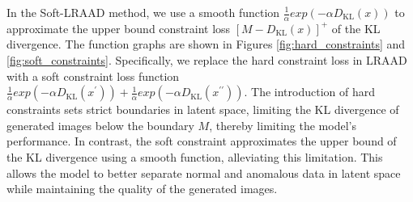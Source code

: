 \documentclass{article}
\begin{document}
In the Soft-LRAAD method, we use a smooth function $\frac{1}{\alpha}exp(- \alpha D_{\mathrm{KL}}(x))$ to approximate the upper bound constraint loss $[M - D_{\mathrm{KL}}(x)]^{+}$ of the KL divergence. The function graphs are shown in Figures \ref{fig:hard_constraints} and \ref{fig:soft_constraints}. Specifically, we replace the hard constraint loss in LRAAD with a soft constraint loss function $\frac{1}{\alpha}exp(- \alpha D_{\mathrm{KL}}(x^\prime)) + \frac{1}{\alpha}exp(-\alpha D_{\mathrm{KL}}(x^{\prime\prime}))$. The introduction of hard constraints sets strict boundaries in latent space, limiting the KL divergence of generated images below the boundary $M$, thereby limiting the model's performance. In contrast, the soft constraint approximates the upper bound of the KL divergence using a smooth function, alleviating this limitation. This allows the model to better separate normal and anomalous data in latent space while maintaining the quality of the generated images.
\end{document}

